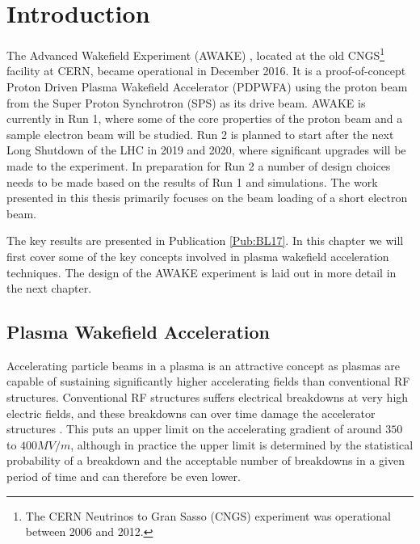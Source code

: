 %
%

\chapter{Introduction}
\label{Ch:Intro}

The Advanced Wakefield Experiment (AWAKE) \cite{awake_collaboration:2014}, located at the old CNGS\footnote{The CERN Neutrinos to Gran Sasso (CNGS) experiment was operational between 2006 and 2012.} facility at CERN, became operational in December 2016. It is a proof-of-concept Proton Driven Plasma Wakefield Accelerator (PDPWFA) using the proton beam from the Super Proton Synchrotron (SPS) as its drive beam. AWAKE is currently in Run 1, where some of the core properties of the proton beam and a sample electron beam will be studied. Run 2 is planned to start after the next Long Shutdown of the LHC in 2019 and 2020, where significant upgrades will be made to the experiment. In preparation for Run 2 a number of design choices needs to be made based on the results of Run 1 and simulations. The work presented in this thesis primarily focuses on the beam loading of a short electron beam.

The key results are presented in Publication \ref{Pub:BL17}. In this chapter we will first cover some of the key concepts involved in plasma wakefield acceleration techniques. The design of the AWAKE experiment is laid out in more detail in the next chapter.

\section{Plasma Wakefield Acceleration}
\label{Int:PWFA}

Accelerating particle beams in a plasma is an attractive concept as plasmas are capable of sustaining significantly higher accelerating fields than conventional RF structures. Conventional RF structures suffers electrical breakdowns at very high electric fields, and these breakdowns can over time damage the accelerator structures \cite{braun:2003}. This puts an upper limit on the accelerating gradient of around $350$ to $400\unit{MV/m}$, although in practice the upper limit is determined by the statistical probability of a breakdown and the acceptable number of breakdowns in a given period of time \cite{pritzkau:2002} and can therefore be even lower.

